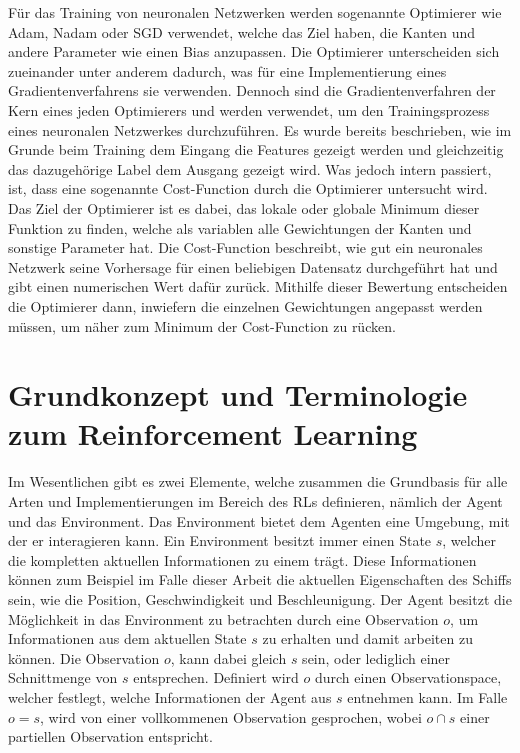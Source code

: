 \documentclass[]{iat}
\begin{document}
Für das Training von neuronalen Netzwerken werden sogenannte Optimierer wie Adam, Nadam oder SGD verwendet, welche das Ziel haben, die Kanten und andere Parameter wie einen Bias anzupassen. Die Optimierer unterscheiden sich zueinander unter anderem dadurch, was für eine Implementierung eines Gradientenverfahrens sie verwenden. Dennoch sind die Gradientenverfahren der Kern eines jeden Optimierers und werden verwendet, um den Trainingsprozess eines neuronalen Netzwerkes durchzuführen. Es wurde bereits beschrieben, wie im Grunde beim Training dem Eingang die Features gezeigt werden und gleichzeitig das dazugehörige Label dem Ausgang gezeigt wird. Was jedoch intern passiert, ist, dass eine sogenannte Cost-Function durch die Optimierer untersucht wird. Das Ziel der Optimierer ist es dabei, das lokale oder globale Minimum dieser Funktion zu finden, welche als variablen alle Gewichtungen der Kanten und sonstige Parameter hat. Die Cost-Function beschreibt, wie gut ein neuronales Netzwerk seine Vorhersage für einen beliebigen Datensatz durchgeführt hat und gibt einen numerischen Wert dafür zurück. Mithilfe dieser Bewertung entscheiden die Optimierer dann, inwiefern die einzelnen Gewichtungen angepasst werden müssen, um näher zum Minimum der Cost-Function zu rücken. \cite[]{KrusComp2015}

\section{Grundkonzept und Terminologie zum Reinforcement Learning} \label{sec:grundkonzept_rf}
Im Wesentlichen gibt es zwei Elemente, welche zusammen die Grundbasis für alle Arten und Implementierungen im Bereich des RLs definieren, nämlich der Agent und das Environment. Das Environment bietet dem Agenten eine Umgebung, mit der er interagieren kann. Ein Environment besitzt immer einen State $s$, welcher die kompletten aktuellen Informationen zu einem trägt. Diese Informationen können zum Beispiel im Falle dieser Arbeit die aktuellen Eigenschaften des Schiffs sein, wie die Position, Geschwindigkeit und Beschleunigung. Der Agent besitzt die Möglichkeit in das Environment zu betrachten durch eine Observation $o$, um Informationen aus dem aktuellen State $s$ zu erhalten und damit arbeiten zu können. Die Observation $o$, kann dabei gleich $s$ sein, oder lediglich einer Schnittmenge von $s$ entsprechen. Definiert wird $o$ durch einen Observationspace, welcher festlegt, welche Informationen der Agent aus $s$ entnehmen kann. Im Falle $o=s$, wird von einer vollkommenen Observation gesprochen, wobei $o \cap s$ einer partiellen Observation entspricht. \cite[]{SpinningUp2018} \cite[]{Sutton1998}
\end{document}
